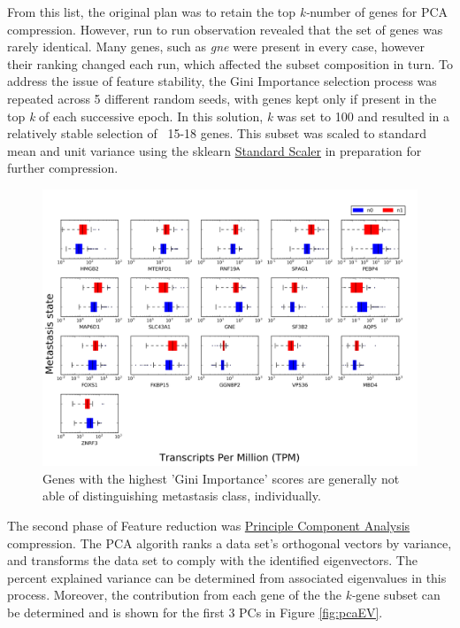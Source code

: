 \documentclass[final]{article}
\begin{document}
From this list, the original plan was to retain the top \textit{k-}number of
genes for PCA compression.  However, run to run observation revealed that the
set of genes  was rarely identical.  Many genes, such as \textit{gne} were
present in every case, however their ranking changed each run, which affected
the subset composition in turn.  To address the issue of feature stability, the Gini
Importance selection process was repeated across 5 different random seeds, with
genes kept only if present in the top \textit{k} of each successive epoch.  In this
solution, \textit{k} was set to 100 and resulted in a relatively stable selection of
~15-18 genes.  This subset was scaled to standard mean and unit variance using the sklearn
\href{http://scikit-learn.org/stable/modules/generated/sklearn.preprocessing.StandardScaler.html#sklearn.preprocessing.StandardScaler}{Standard Scaler} in preparation for further compression.

\begin{figure}[h!]
  \centering
  \includegraphics[width=\textwidth]{boxplots}
  \caption{\label{fig:separate}Genes with the highest 'Gini Importance' scores are generally not able of distinguishing metastasis class, individually.}
\end{figure}


The second phase of Feature reduction was \href{http://scikit-learn.org/stable/modules/generated/sklearn.decomposition.PCA.html#sklearn.decomposition.PCA}{Principle Component Analysis}
compression. The PCA algorith ranks a data set's orthogonal vectors by variance, and transforms the data set to comply with the identified eigenvectors.  The percent explained
variance can be determined from associated eigenvalues in this process.  Moreover, the contribution
from each gene of the the \textit{k-}gene subset can be determined and is shown for the first
3 PCs in Figure \ref{fig:pcaEV}.
\end{document}

